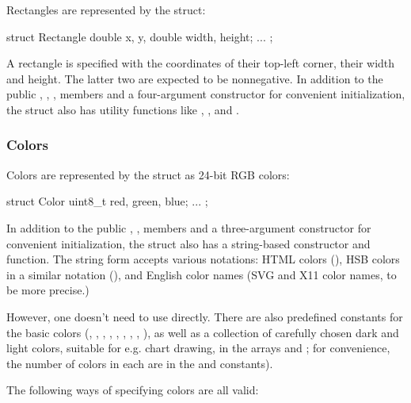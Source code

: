 Rectangles are represented by the  struct:

\begin{cpp}
struct Rectangle {
    double x, y,
    double width, height;
    ...
};
\end{cpp}

A rectangle is specified with the coordinates of their top-left corner,
their width and height. The latter two are expected to be nonnegative. In
addition to the public , , ,  members
and a four-argument constructor for convenient initialization, the struct
also has utility functions like , ,
 and .

\subsubsection{Colors}
\label{sec:graphics:canvas-colors}

Colors are represented by the  struct as 24-bit RGB colors:

\begin{cpp}
struct Color {
    uint8_t red, green, blue;
    ...
};
\end{cpp}

In addition to the public , ,  members
and a three-argument constructor for convenient initialization, the struct
also has a string-based constructor and  function.
The string form accepts various notations: HTML colors (),
HSB colors in a similar notation (), and English color names
(SVG and X11 color names, to be more precise.)

However, one doesn't need to use  directly.
There are also predefined constants for the basic colors (,
, , , , , ,
, ), as well as a collection of carefully chosen
dark and light colors, suitable for e.g. chart drawing, in the arrays
 and ; for convenience,
the number of colors in each are in the 
and  constants).

The following ways of specifying colors are all valid:



